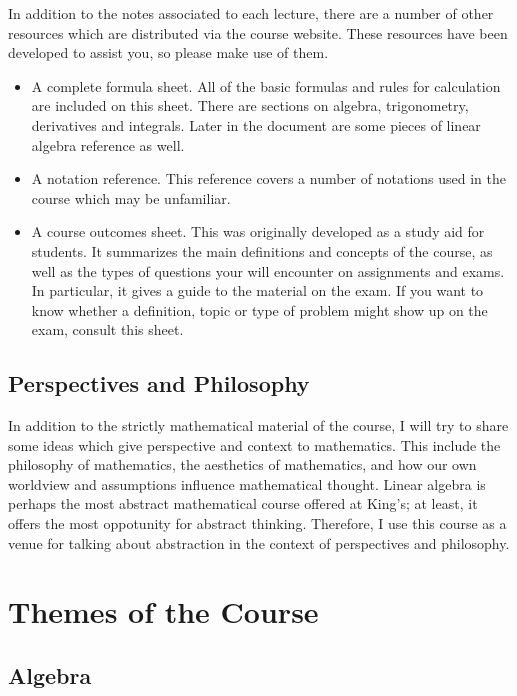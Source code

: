 \documentclass[fleqn]{report}
\begin{document}
In addition to the notes associated to each lecture, there are
a number of other resources which are distributed via
the course website. These resources have been developed to
assist you, so please make use of them. 

\begin{itemize}
\item A complete formula sheet. All of the basic formulas and
rules for calculation are included on this sheet. There are
sections on algebra, trigonometry, derivatives and integrals.
Later in the document are some pieces of linear algebra
reference as well.
\item A notation reference. This reference covers a number of
notations used in the course which may be unfamiliar. 
\item A course outcomes sheet. This was originally
developed as a study aid for students. It summarizes the main
definitions and concepts of the course, as well as the types
of questions your will encounter on assignments and exams. In
particular, it gives a guide to the material on the exam. If
you want to know whether a definition, topic or type of
problem might show up on the exam, consult this sheet. 
\end{itemize}

\section*{Perspectives and Philosophy}

In addition to the strictly mathematical material of the
course, I will try to share some ideas which give perspective
and context to mathematics. This include the philosophy of
mathematics, the aesthetics of mathematics, and how our own worldview and
assumptions influence mathematical thought. Linear algebra is
perhaps the most abstract mathematical course offered at
King's; at least, it offers the most oppotunity for
abstract thinking. Therefore, I use this course as a venue for
talking about abstraction in the context of perspectives and
philosophy.

\chapter{Themes of the Course}
\label{themes}

\section{Algebra}
\end{document}
